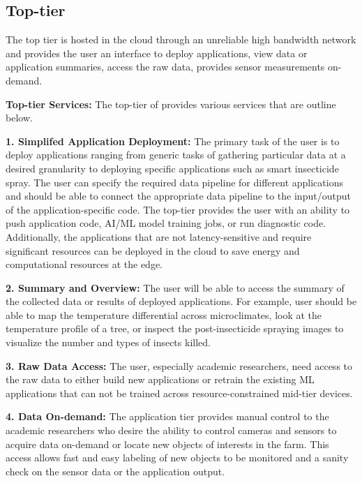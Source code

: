 \subsection{Top-tier}

The top tier is hosted in the cloud through an unreliable high bandwidth network and provides the user an interface to deploy applications, view data or application summaries, access the raw data, provides sensor measurements on-demand. 

\noindent
\textbf{Top-tier Services: } The top-tier of \myname{} provides various services that are outline below. 

\noindent
\textbf{1. Simplifed Application Deployment:} The primary task of the user is to deploy applications ranging from generic tasks of gathering particular data at a desired granularity to deploying specific applications such as smart insecticide spray. The user can specify the required data pipeline for different applications and should be able to connect the appropriate data pipeline to the input/output of the application-specific code. The top-tier provides the user with an ability to push application code, AI/ML model training jobs, or run diagnostic code. Additionally, the applications that are not latency-sensitive and require significant resources can be deployed in the cloud to save energy and computational resources at the edge.


\noindent
\textbf{2. Summary and Overview:} The user will be able to access the summary of the collected data or results of deployed applications. For example, user should be able to map the temperature differential across microclimates, look at the temperature profile of a tree, or inspect the post-insecticide spraying images to visualize the number and types of insects killed. 

\noindent
\textbf{3. Raw Data Access:} The user, especially academic researchers, need access to the raw data to either build new applications or retrain the existing ML applications that can not be trained across resource-constrained mid-tier devices. 

\noindent
\textbf{4. Data On-demand:} The application tier provides manual control to the academic researchers who desire the ability to control cameras and sensors to acquire data on-demand or locate new objects of interests in the farm. This access allows fast and easy labeling of new objects to be monitored and a sanity check on the sensor data or the application output. \\

